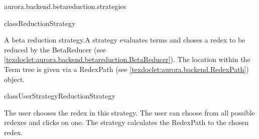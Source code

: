 \begin{texdocpackage}{aurora.backend.betareduction.strategies}
\begin{texdocclass}{class}{ReductionStrategy}{}{}
\label{texdoclet:aurora.backend.betareduction.strategies.ReductionStrategy}
\begin{texdocclassintro}
A beta reduction strategy.\texdocbr  A strategy evaluates terms and choses a redex to be reduced by the BetaReducer (see \ref{texdoclet:aurora.backend.betareduction.BetaReducer}).
 The location within the Term tree is given via a RedexPath (see \ref{texdoclet:aurora.backend.RedexPath}) object.\end{texdocclassintro}
\begin{texdocclassconstructors}
\end{texdocclassconstructors}
\begin{texdocclassmethods}
\end{texdocclassmethods}
\end{texdocclass}


\begin{texdocclass}{class}{UserStrategy}{ReductionStrategy}{}
\label{texdoclet:aurora.backend.betareduction.strategies.UserStrategy}
\begin{texdocclassintro}
The user chooses the redex in this strategy.
 The user can choose from all possible redexes and clicks on one.
 The strategy calculates the RedexPath to the chosen redex.\end{texdocclassintro}
\begin{texdocclassconstructors}
\end{texdocclassconstructors}
\begin{texdocclassmethods}
\end{texdocclassmethods}
\end{texdocclass}


\end{texdocpackage}



